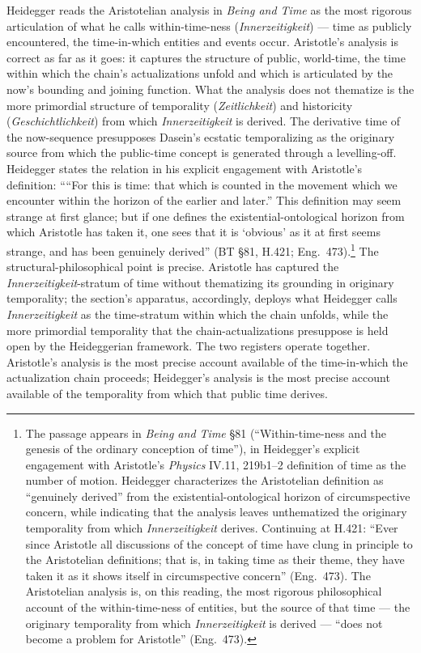 \documentclass{article}
\begin{document}
Heidegger reads the Aristotelian analysis in \textit{Being and Time} as the most rigorous articulation of what he calls within-time-ness (\textit{Innerzeitigkeit}) --- time as publicly encountered, the time-in-which entities and events occur. Aristotle's analysis is correct as far as it goes: it captures the structure of public, world-time, the time within which the chain's actualizations unfold and which is articulated by the now's bounding and joining function. What the analysis does not thematize is the more primordial structure of temporality (\textit{Zeitlichkeit}) and historicity (\textit{Geschichtlichkeit}) from which \textit{Innerzeitigkeit} is derived. The derivative time of the now-sequence presupposes Dasein's ecstatic temporalizing as the originary source from which the public-time concept is generated through a levelling-off. Heidegger states the relation in his explicit engagement with Aristotle's definition: ````For this is time: that which is counted in the movement which we encounter within the horizon of the earlier and later.'' This definition may seem strange at first glance; but if one defines the existential-ontological horizon from which Aristotle has taken it, one sees that it is `obvious' as it at first seems strange, and has been genuinely derived'' (BT \S 81, H.421; Eng.~473).\footnote{The passage appears in \textit{Being and Time} \S 81 (``Within-time-ness and the genesis of the ordinary conception of time''), in Heidegger's explicit engagement with Aristotle's \textit{Physics} IV.11, 219b1--2 definition of time as the number of motion. Heidegger characterizes the Aristotelian definition as ``genuinely derived'' from the existential-ontological horizon of circumspective concern, while indicating that the analysis leaves unthematized the originary temporality from which \textit{Innerzeitigkeit} derives. Continuing at H.421: ``Ever since Aristotle all discussions of the concept of time have clung in principle to the Aristotelian definitions; that is, in taking time as their theme, they have taken it as it shows itself in circumspective concern'' (Eng.~473). The Aristotelian analysis is, on this reading, the most rigorous philosophical account of the within-time-ness of entities, but the source of that time --- the originary temporality from which \textit{Innerzeitigkeit} is derived --- ``does not become a problem for Aristotle'' (Eng.~473).} The structural-philosophical point is precise. Aristotle has captured the \textit{Innerzeitigkeit}-stratum of time without thematizing its grounding in originary temporality; the section's apparatus, accordingly, deploys what Heidegger calls \textit{Innerzeitigkeit} as the time-stratum within which the chain unfolds, while the more primordial temporality that the chain-actualizations presuppose is held open by the Heideggerian framework. The two registers operate together. Aristotle's analysis is the most precise account available of the time-in-which the actualization chain proceeds; Heidegger's analysis is the most precise account available of the temporality from which that public time derives.
\end{document}
